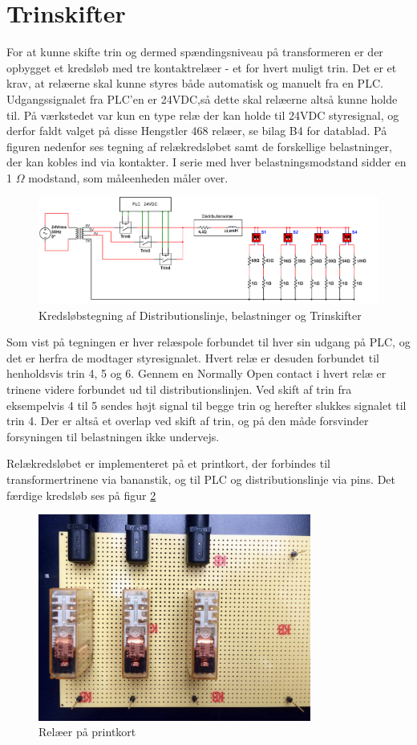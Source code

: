 

\section{Trinskifter}
\label{sec:Trinskifter}
For at kunne skifte trin og dermed spændingsniveau på transformeren er der opbygget et kredsløb med tre kontaktrelæer - et for hvert muligt trin. Det er et krav, at relæerne skal kunne styres både automatisk og manuelt fra en PLC. Udgangssignalet fra PLC'en er 24VDC,så dette skal relæerne altså kunne holde til. På værkstedet var kun en type relæ der kan holde til 24VDC styresignal, og derfor faldt valget på disse Hengstler 468 relæer, se bilag B4 for datablad. På figuren nedenfor ses tegning af relækredsløbet samt de forskellige belastninger, der kan kobles ind via kontakter. I serie med hver belastningsmodstand sidder en 1 $\Omega$ modstand, som måleenheden måler over. 


\begin{figure}[H] 
	\centering
	\includegraphics[width=1\textwidth]{Figure/Trinskiftertegning2}
	\caption{Kredsløbstegning af Distributionslinje, belastninger og Trinskifter}
	\label{fig:Trinskiftertegning2}
\end{figure}

Som vist på tegningen er hver relæspole forbundet til hver sin udgang på PLC, og det er herfra de modtager styresignalet. Hvert relæ er desuden forbundet til henholdsvis trin 4, 5 og 6. Gennem en Normally Open contact i hvert relæ er trinene videre forbundet ud til distributionslinjen. Ved skift af trin fra eksempelvis 4 til 5 sendes højt signal til begge trin og herefter slukkes signalet til trin 4. Der er altså et overlap ved skift af trin, og på den måde forsvinder forsyningen til belastningen ikke undervejs. 

Relækredsløbet er implementeret på et printkort, der forbindes til transformertrinene via bananstik, og til PLC og distributionslinje via pins. Det færdige kredsløb ses på figur \ref{fig:Relaekredsloeb}

\begin{figure}[H] 
	\centering
	\includegraphics[width=0.8\textwidth]{Figure/Relaekredsl}
	\caption{Relæer på printkort}
	\label{fig:Relaekredsloeb}
\end{figure}


